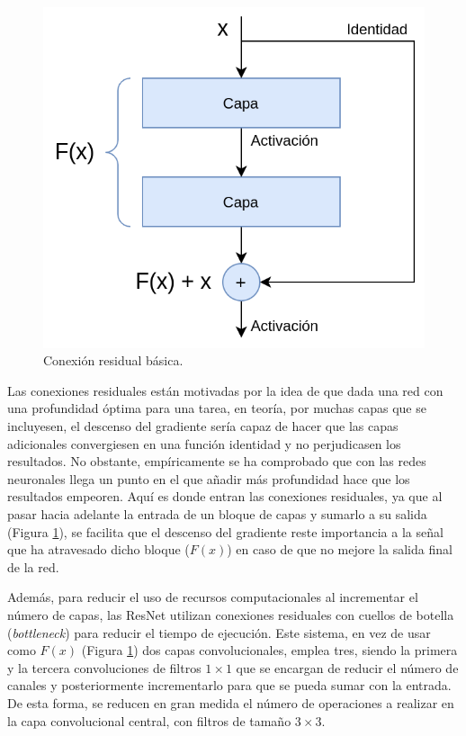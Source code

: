 \pagebreak

\begin{figure}
\vspace{-5pt}
\includegraphics[width=0.95\linewidth]{imagenes/residual-connection.png} 
\caption{Conexión residual básica.}
\label{fig:residual}
\end{figure}

Las conexiones residuales están motivadas por la idea de que dada una red con una profundidad óptima para una tarea, en teoría, por muchas capas que se incluyesen, el descenso del gradiente sería capaz de hacer que las capas adicionales convergiesen en una función identidad y no perjudicasen los resultados. No obstante, empíricamente se ha comprobado que con las redes neuronales llega un punto en el que añadir más profundidad hace que los resultados empeoren. Aquí es donde entran las conexiones residuales, ya que al pasar hacia adelante la entrada de un bloque de capas y sumarlo a su salida (Figura \ref{fig:residual}), se facilita que el descenso del gradiente reste importancia a la señal que ha atravesado dicho bloque ($F(x)$) en caso de que no mejore la salida final de la red.

Además, para reducir el uso de recursos computacionales al incrementar el número de capas, las ResNet utilizan conexiones residuales con cuellos de botella (\textit{bottleneck}) para reducir el tiempo de ejecución. Este sistema, en vez de usar como $F(x)$ (Figura \ref{fig:residual}) dos capas convolucionales, emplea tres, siendo la primera y la tercera convoluciones de filtros $1\times1$ que se encargan de reducir el número de canales y posteriormente incrementarlo para que se pueda sumar con la entrada. De esta forma, se reducen en gran medida el número de operaciones a realizar en la capa convolucional central, con filtros de tamaño $3\times3$. 

